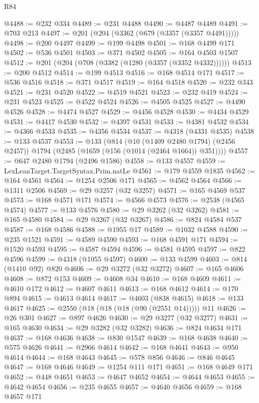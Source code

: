 \begin{lexlean}{R84}
\begin{coremodule}
@4488 := @232 @334
@4489 := @231 @4488
@4490 := @4487 @4489
@4491 := @703 @213
@4497 := @201 (@204 (@3362 (@679 (@3357 (@3357 @4491)))))
@4498 := @200 @4497
@4499 := @199 @4498
@4501 := @168 @4499 @171
@4502 := @536 @4501
@4503 := @371 @4502
@4505 := @164 @4503 @1507
@4512 := @201 (@204 (@708 (@3382 (@1280 (@3357 (@3352 @4332))))))
@4513 := @200 @4512
@4514 := @199 @4513
@4516 := @168 @4514 @171
@4517 := @536 @4516
@4518 := @371 @4517
@4519 := @164 @4518
@4520 := @232 @343
@4521 := @231 @4520
@4522 := @4519 @4521
@4523 := @232 @419
@4524 := @231 @4523
@4525 := @4522 @4524
@4526 := @4505 @4525
@4527 := @4490 @4526
@4528 := @4474 @4527
@4529 := @4456 @4528
@4530 := @4434 @4529
@4531 := @4417 @4530
@4532 := @4397 @4531
@4533 := @4381 @4532
@4534 := @4366 @4533
@4535 := @4356 @4534
@4537 := @4318 (@4331 @4535)
@4538 := @133 @4537
@4553 := @133
    (@814
      (@10 (@1409 @2480 @1794) (@2456 @2457))
      @1794
      (@2485 (@1659 (@156 (@1014 (@2464 @1664)) @351))))
@4557 := @647 @2480 @1794 (@2496 @1586)
@4558 := @133 @4557
@4559 := LexLeanTarget.TargetSyntax.Prim.natLe
@4561 := @179 @4559 @1835
@4562 := @164 @4561
@4564 := @1254 @2506 @171
@4565 := @4562 @4564
@4566 := @1311 @2506
@4569 := @29 @3257 (@32 @3257)
@4571 := @165 @4569 @537
@4573 := @168 @4571 @171
@4574 := @4566 @4573
@4576 := @2538 (@4565 @4574)
@4577 := @133 @4576
@4580 := @29 @3262 (@32 @3262)
@4581 := @165 @4580
@4584 := @29 @3267 (@32 @3267)
@4586 := @824 @4584 @537
@4587 := @168 @4586
@4588 := @1955 @17
@4589 := @1032 @4588
@4590 := @235 @1521
@4591 := @4589 @4590
@4593 := @168 @4591 @171
@4594 := @1520 @4593
@4595 := @4587 @4594
@4596 := @4581 @4595
@4597 := @822 @4596
@4599 := @4318 (@1055 @4597)
@4600 := @133 @4599
@4603 := @814 (@1410 @92) @820
@4606 := @29 @3272 (@32 @3272)
@4607 := @165 @4606
@4608 := @872 @153
@4609 := @4608 @34
@4610 := @168 @4609
@4611 := @4610 @172
@4612 := @4607 @4611
@4613 := @168 @4612
@4614 := @170 @894
@4615 := @4613 @4614
@4617 := @4603 (@838 @4615)
@4618 := @133 @4617
@4625 := @2550 (@18 (@18 (@18 (@90 (@2551 @14))))) @11
@4626 := @26 @301
@4627 := @897 @4626
@4630 := @29 @3277 (@32 @3277)
@4631 := @165 @4630
@4634 := @29 @3282 (@32 @3282)
@4636 := @824 @4634 @171
@4637 := @168 @4636
@4638 := @830 @1547
@4639 := @168 @4638
@4640 := @575 @4626
@4641 := @2966 @4614
@4642 := @168 @4641
@4643 := @950 @4614
@4644 := @168 @4643
@4645 := @578 @856
@4646 := @846 @4645
@4647 := @168 @4646
@4649 := @1254 @111 @171
@4651 := @168 @4649 @171
@4652 := @448 @4651
@4653 := @4647 @4652
@4654 := @4644 @4653
@4655 := @4642 @4654
@4656 := @235 @4655
@4657 := @4640 @4656
@4659 := @168 @4657 @171

\end{coremodule}
\end{lexlean}
